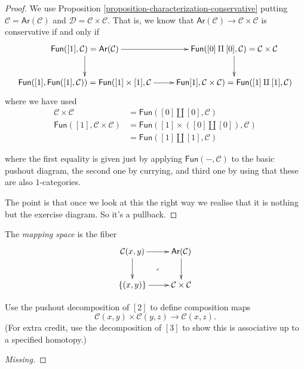 \begin{proof}
We use Proposition \ref{proposition-characterization-conservative}
putting $\mathcal{C}=\mathsf{Ar}(\mathcal{C})$ and
$\mathcal{D}=\mathcal{C} \times \mathcal{C}$.
That is, we know that 
$\mathsf{Ar}(\mathcal{C}) \to \mathcal{C} \times \mathcal{C}$ 
is conservative if and only if
$$
\xymatrix{
\mathsf{Fun}([1],\mathcal{C})=\mathsf{Ar}(\mathcal{C})\ar[r]\ar[d]&
\mathsf{Fun}([0]\amalg [0],\mathcal{C})=\mathcal{C}\times\mathcal{C}\ar[d]\\
\mathsf{Fun}([1],\mathsf{Fun}([1],\mathcal{C}))
=\mathsf{Fun}([1]\times[1],\mathcal{C}\ar[r]&
\mathsf{Fun}[1],\mathcal{C} \times\mathcal{C})
=\mathsf{Fun}([1]\amalg[1],\mathcal{C})
}
$$
where we have used
\begin{align*}
\mathcal{C}\times\mathcal{C}&=\mathsf{Fun}([0]\amalg[0],\mathcal{C})\\
\mathsf{Fun}([1],\mathcal{C}\times\mathcal{C})
&=\mathsf{Fun}([1]\times([0]\amalg[0]),\mathcal{C})\\
&=\mathsf{Fun}([1]\amalg[1],\mathcal{C})
\end{align*}

\noindent
where the first equality is given
just by applying $\mathsf{Fun}(-,\mathcal{C})$
to the basic pushout diagram,
the second one by currying,
and third one by
using that these are also $1$-categories.

The point is that once
we look at this the right way
we realise that it is nothing but 
the exercise diagram. So it's a pullback.
\end{proof}

\begin{definition}
\label{definition-mapping-space}
The {\it mapping space} is the fiber
$$
\xymatrix{
\mathcal{C}(x,y)\ar[r]\ar[d]\ar@{}[dr]|-{\lrcorner}
&\mathsf{Ar}(\mathcal{C})\ar[d]\\
\{(x,y)\}\ar[r]&\mathcal{C}\times\mathcal{C}
}
$$
\end{definition}

\begin{exercise}
\label{exercise-compositions}
Use the pushout decomposition of $[2]$ 
to define composition maps
$$
\mathcal{C}(x,y)\times\mathcal{C}(y,z)\to\mathcal{C}(x,z).
$$
(For extra credit, use the decomposition
of $[3]$ to show this is associative
up to a specified homotopy.)
\end{exercise}

\begin{proof}
[Missing]
\end{proof}

